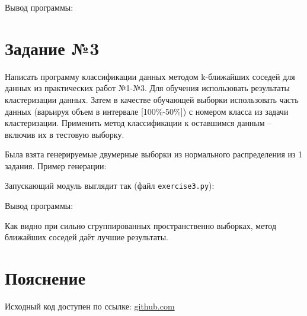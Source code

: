 \documentclass{article} %
\begin{document}
Вывод программы:


\clearpage
\section{Задание №3}
Написать программу классификации данных методом k-ближайших соседей для данных из
практических работ №1-№3. Для обучения использовать результаты кластеризации
данных. Затем в качестве обучающей выборки использовать часть данных (варьируя объем
в интервале [100\%-50\%]) с номером класса из задачи кластеризации. Применить метод
классификации к оставшимся данным – включив их в тестовую выборку.
\bigskip

Была взята генерируемые двумерные выборки из нормального распределения
из 1 задания.
Пример генерации:

\noindent{}

Запускающий модуль выглядит так (файл \verb$exercise3.py$):
\bigskip

Вывод программы:

\bigskip

Как видно при сильно сгруппированных
пространственно выборках,
метод ближайших соседей даёт лучшие результаты.

\section{Пояснение}
Исходный код доступен по ссылке:
\href{https://github.com/SvichkarevAnatoly/Course-Python-Bioinformatics/tree/master/semester2/task4}
{github.com}
\end{document}
